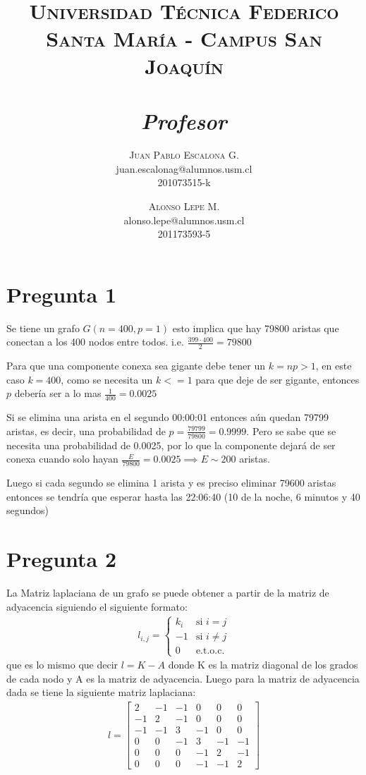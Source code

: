 \documentclass[letterpaper]{article}
\title{
    \textmd{\textbf{\guiaRamo\\ \guiaTitulo}}\\
    \vspace{0.1in}
    \large{\textsc{Universidad Técnica Federico Santa María - Campus San Joaquín}}\\
    \normalsize\vspace{0.1in}\small{\guiaFecha}\\
    \vspace{0.1in}\large{\textit{Profesor \guiaProfesor}}
}
\author{
    \textsc{Juan Pablo Escalona G.} \\
    \small{juan.escalonag@alumnos.usm.cl} \\
    {\small 201073515-k}
    \and
     \textsc{Alonso Lepe M.} \\
    \small{alonso.lepe@alumnos.usm.cl}\\
    {\small 201173593-5}
\vspace{.5in}
}
\date{}
\begin{document}
\maketitle
\section{Pregunta 1}
Se tiene un grafo $G(n=400,p=1)$ esto implica que hay 79800 aristas que conectan a los 400 nodos entre todos. i.e. $\frac{399 \cdot 400}{2} = 79800$

Para que una componente conexa sea gigante debe tener un $k = np > 1$, en este caso $k = 400$, como se necesita un $k <= 1$ para que deje de ser gigante, entonces $p$ debería ser a lo mas $\frac{1}{400} = 0.0025$

Si se elimina una arista en el segundo 00:00:01 entonces aún quedan 79799 aristas, es decir, una probabilidad de $p = \frac{79799}{79800} = 0.9999$. Pero se sabe que se necesita una probabilidad de 0.0025, por lo que la componente dejará de ser conexa cuando solo hayan $\frac{E}{79800} = 0.0025 \implies E \sim 200$ aristas.

Luego si cada segundo se elimina 1 arista y es preciso eliminar 79600 aristas entonces se tendría que esperar hasta las 22:06:40 (10 de la noche, 6 minutos y 40 segundos)

\section{Pregunta 2}
La Matriz laplaciana de un grafo se puede obtener a partir de la matriz de adyacencia siguiendo el siguiente formato:
\begin{align}
  l_{i,j} =
  \begin{cases}
    k_i  & \text{si } i = j  \\
    -1  & \text{si } i \neq j  \\
    0  & \text{e.t.o.c.}
  \end{cases}
\end{align}
que es lo mismo que decir $l = K - A$ donde K es la matriz diagonal de los grados de cada nodo y A es la matriz de adyacencia. Luego para la matriz de adyacencia dada se tiene la siguiente matriz laplaciana:
\begin{align}
l = \begin{bmatrix}
   2  &-1  &-1  & 0  & 0  & 0    \\
   -1 &  2 & -1 &  0 &  0 &  0   \\
   -1 & -1 &  3 & -1 &  0 &  0   \\
    0 &  0 & -1 &  3 & -1 & -1   \\
    0 &  0 &  0 & -1 &  2 & -1   \\
    0 &  0 &  0 & -1 & -1 &  2
\end{bmatrix}
\end{align}
\end{document}
